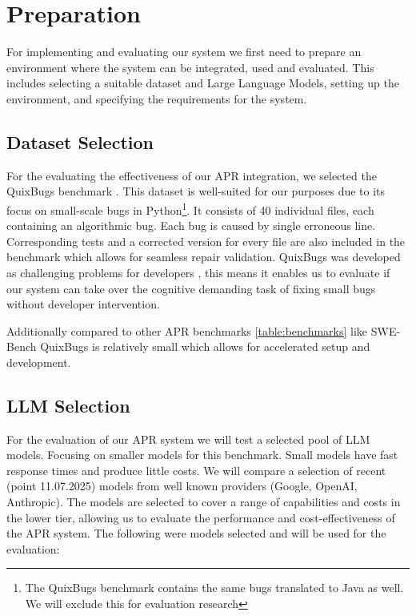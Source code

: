 \section{Preparation}

For implementing and evaluating our system we first need to prepare an environment where the system can be integrated, used and evaluated. This includes selecting a suitable dataset and Large Language Models, setting up the environment, and specifying the requirements for the system.

\subsection{Dataset Selection}

For the evaluating the effectiveness of our APR integration, we selected the QuixBugs benchmark \cite{linQuixBugsMultilingualProgram2017}. This dataset is well-suited for our purposes due to its focus on small-scale bugs in Python\footnote{The QuixBugs benchmark contains the same bugs translated to Java as well. We will exclude this for evaluation research}. It consists of 40 individual files, each containing an algorithmic bug. Each bug is caused by single erroneous line. Corresponding tests and a corrected version for every file are also included in the benchmark which allows for seamless repair validation. QuixBugs was developed as challenging problems for developers \cite{linQuixBugsMultilingualProgram2017}, this means it enables us to evaluate if our system can take over the cognitive demanding task of fixing small bugs without developer intervention.

Additionally compared to other APR benchmarks \ref{table:benchmarks} like SWE-Bench \cite{jimenezSWEbenchCanLanguage2024} QuixBugs is relatively small which allows for accelerated setup and development.

\subsection{LLM Selection} \label{subsection:llm-selection}

For the evaluation of our APR system we will test a selected pool of LLM models. Focusing on smaller models for this benchmark. Small models have fast response times and produce little costs. We will compare a selection of recent (point 11.07.2025) models from well known providers (Google, OpenAI, Anthropic). The models are selected to cover a range of capabilities and costs in the lower tier, allowing us to evaluate the performance and cost-effectiveness of the APR system. The following were models selected and will be used for the evaluation:

